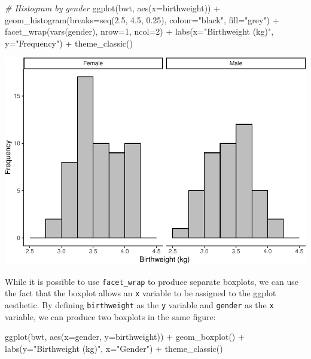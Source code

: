 \documentclass[
]{memoir}
\newenvironment{Shaded}{\begin{snugshade}}{\end{snugshade}}
\newcommand{\AttributeTok}[1]{\textcolor[rgb]{0.77,0.63,0.00}{#1}}
\newcommand{\CommentTok}[1]{\textcolor[rgb]{0.56,0.35,0.01}{\textit{#1}}}
\newcommand{\DecValTok}[1]{\textcolor[rgb]{0.00,0.00,0.81}{#1}}
\newcommand{\FloatTok}[1]{\textcolor[rgb]{0.00,0.00,0.81}{#1}}
\newcommand{\FunctionTok}[1]{\textcolor[rgb]{0.00,0.00,0.00}{#1}}
\newcommand{\NormalTok}[1]{#1}
\newcommand{\SpecialCharTok}[1]{\textcolor[rgb]{0.00,0.00,0.00}{#1}}
\newcommand{\StringTok}[1]{\textcolor[rgb]{0.31,0.60,0.02}{#1}}
\begin{document}
\begin{Shaded}
\begin{Highlighting}[]
\CommentTok{\# Histogram by gender}
\FunctionTok{ggplot}\NormalTok{(bwt, }\FunctionTok{aes}\NormalTok{(}\AttributeTok{x=}\NormalTok{birthweight)) }\SpecialCharTok{+} 
  \FunctionTok{geom\_histogram}\NormalTok{(}\AttributeTok{breaks=}\FunctionTok{seq}\NormalTok{(}\FloatTok{2.5}\NormalTok{, }\FloatTok{4.5}\NormalTok{, }\FloatTok{0.25}\NormalTok{), }\AttributeTok{colour=}\StringTok{"black"}\NormalTok{, }\AttributeTok{fill=}\StringTok{"grey"}\NormalTok{) }\SpecialCharTok{+} 
  \FunctionTok{facet\_wrap}\NormalTok{(}\FunctionTok{vars}\NormalTok{(gender), }\AttributeTok{nrow=}\DecValTok{1}\NormalTok{, }\AttributeTok{ncol=}\DecValTok{2}\NormalTok{) }\SpecialCharTok{+}
  \FunctionTok{labs}\NormalTok{(}\AttributeTok{x=}\StringTok{"Birthweight (kg)"}\NormalTok{, }\AttributeTok{y=}\StringTok{"Frequency"}\NormalTok{) }\SpecialCharTok{+}
  \FunctionTok{theme\_classic}\NormalTok{()}
\end{Highlighting}
\end{Shaded}

\includegraphics{phcm9795-R-notes_files/figure-latex/unnamed-chunk-69-2.pdf}

While it is possible to use \texttt{facet\_wrap} to produce separate boxplots, we can use the fact that the boxplot allows an \texttt{x} variable to be assigned to the ggplot aesthetic. By defining \texttt{birthweight} as the \texttt{y} variable and \texttt{gender} as the \texttt{x} variable, we can produce two boxplots in the same figure:

\begin{Shaded}
\begin{Highlighting}[]
\FunctionTok{ggplot}\NormalTok{(bwt, }\FunctionTok{aes}\NormalTok{(}\AttributeTok{x=}\NormalTok{gender, }\AttributeTok{y=}\NormalTok{birthweight)) }\SpecialCharTok{+}
  \FunctionTok{geom\_boxplot}\NormalTok{() }\SpecialCharTok{+}
  \FunctionTok{labs}\NormalTok{(}\AttributeTok{y=}\StringTok{"Birthweight (kg)"}\NormalTok{, }\AttributeTok{x=}\StringTok{"Gender"}\NormalTok{) }\SpecialCharTok{+}
  \FunctionTok{theme\_classic}\NormalTok{()}
\end{Highlighting}
\end{Shaded}
\end{document}
